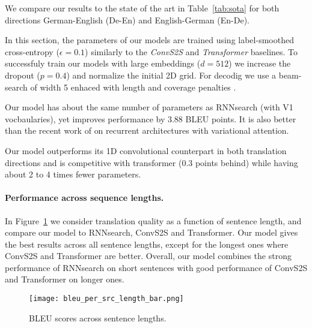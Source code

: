 \documentclass[11pt,a4paper]{article}
\def\fig#1{Figure~\ref{fig:#1}}
\def\tab#1{Table~\ref{tab:#1}}
\begin{document}
 
We compare our results to the state of the art in \tab{sota} for both directions German-English (De-En) and English-German (En-De).


In this section, the parameters of our models are trained using label-smoothed cross-entropy ($\epsilon=0.1$) similarly to the \textit{ConvS2S} and \textit{Transformer} baselines. To successfuly train our models with large embeddings ($d=512$) we increase the dropout ($p=0.4$) and normalize the initial 2D grid. For decodig we use a beam-search of width 5 enhaced with length and coverage penalties \citep{wu16arxiv}.


Our model has about the same number of parameters as RNNsearch (with V1 vocbaularies), yet improves  performance by 3.88 BLEU points.
It is also  better than the recent work of \citet{deng18arxiv} on recurrent architectures with variational attention.

Our model outperforms its 1D convolutional counterpart \citet{gehring17icml} in both translation directions and is competitive with transformer (0.3 points behind) while having about 2 to 4 times fewer parameters.



\paragraph{Performance across sequence lengths.}
In \fig{length} we consider translation quality as a function of 
sentence length, and compare our model to RNNsearch, ConvS2S and Transformer.
Our model gives the best results across all sentence lengths, except for the longest ones where ConvS2S and Transformer are better.
Overall, our model combines the strong performance of RNNsearch on short sentences with good performance of ConvS2S and Transformer on longer ones.



\begin{figure}
    \texttt{[image: bleu\_per\_src\_length\_bar.png]}
    \caption{BLEU scores across sentence lengths.}
    \label{fig:length}
\end{figure}
\end{document}
